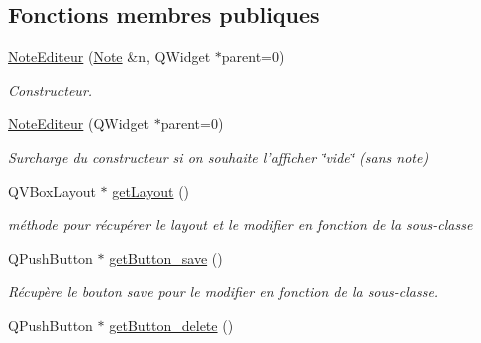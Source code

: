 \subsection*{Fonctions membres publiques}
\begin{DoxyCompactItemize}
\item 
\hyperlink{class_note_editeur_a83821d2de318dfa13a0cbbb321765101}{Note\-Editeur} (\hyperlink{class_note}{Note} \&n, Q\-Widget $\ast$parent=0)
\begin{DoxyCompactList}\small\item\em Constructeur. \end{DoxyCompactList}\item 
\hypertarget{class_note_editeur_a10b76711bf2e20d67fb7508a9dead555}{\hyperlink{class_note_editeur_a10b76711bf2e20d67fb7508a9dead555}{Note\-Editeur} (Q\-Widget $\ast$parent=0)}\label{class_note_editeur_a10b76711bf2e20d67fb7508a9dead555}

\begin{DoxyCompactList}\small\item\em Surcharge du constructeur si on souhaite l'afficher \char`\"{}vide\char`\"{} (sans note) \end{DoxyCompactList}\item 
\hypertarget{class_note_editeur_a1a47bd58dd1331be327a6693941970de}{Q\-V\-Box\-Layout $\ast$ \hyperlink{class_note_editeur_a1a47bd58dd1331be327a6693941970de}{get\-Layout} ()}\label{class_note_editeur_a1a47bd58dd1331be327a6693941970de}

\begin{DoxyCompactList}\small\item\em méthode pour récupérer le layout et le modifier en fonction de la sous-\/classe \end{DoxyCompactList}\item 
\hypertarget{class_note_editeur_a3244691035875af789abf64034e0c02a}{Q\-Push\-Button $\ast$ \hyperlink{class_note_editeur_a3244691035875af789abf64034e0c02a}{get\-Button\-\_\-save} ()}\label{class_note_editeur_a3244691035875af789abf64034e0c02a}

\begin{DoxyCompactList}\small\item\em Récupère le bouton save pour le modifier en fonction de la sous-\/classe. \end{DoxyCompactList}\item 
\hypertarget{class_note_editeur_ae5048eb415f3984cbb0c030a7f56d0fc}{Q\-Push\-Button $\ast$ \hyperlink{class_note_editeur_ae5048eb415f3984cbb0c030a7f56d0fc}{get\-Button\-\_\-delete} ()}\label{class_note_editeur_ae5048eb415f3984cbb0c030a7f56d0fc}


\end{DoxyCompactItemize}

